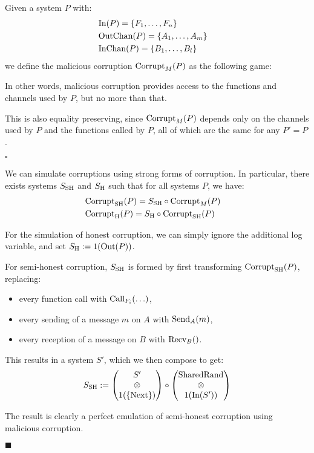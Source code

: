 \begin{definition}
Given a system $P$ with:
$$
\begin{aligned}
  &\text{In}(P) = \{F_1, \ldots, F_n\}\cr
  &\text{OutChan}(P) = \{A_1, \ldots, A_m\}\cr
  &\text{InChan}(P) = \{B_1, \ldots, B_l\}\cr
\end{aligned}
$$
we define the malicious corruption $\text{Corrupt}_M(P)$ as the following game:

In other words, malicious corruption provides access to the functions
and channels used by $P$, but no more than that.

This is also equality preserving, since $\text{Corrupt}_M(P)$ depends
only on the channels used by $P$ and the functions called by $P$,
all of which are the same for any $P' = P$.

$\square$
\end{definition}

\begin{lemma}
  \label{thm:simulatingcorruption}
  We can simulate corruptions using strong forms of corruption.
  In particular, there exists systems $S_{\text{SH}}$ and $S_{\text{H}}$ such that
  for all systems $P$, we have:
  \[
    \begin{aligned}
      &\text{Corrupt}_{\text{SH}}(P) = S_{\text{SH}} \circ \text{Corrupt}_M(P)\cr
      &\text{Corrupt}_{\text{H}}(P) = S_{\text{H}} \circ \text{Corrupt}_{\text{SH}}(P)
    \end{aligned}
  \]

For the simulation of honest corruption, we can simply ignore
  the additional log variable, and set $S_{\text{H}} := 1(\text{Out}(P))$.

For semi-honest corruption, $S_{\text{SH}}$ is formed by first transforming
$\text{Corrupt}_{\text{SH}}(P)$, replacing:
\begin{itemize}
  \item every function call with $\text{Call}_{F_i}(\ldots)$,
  \item every sending of a message $m$ on $A$ with $\text{Send}_A(m)$,
  \item every reception of a message on $B$ with $\text{Recv}_B()$.
\end{itemize}
This results in a system $S'$, which we then compose to get:
$$
S_{\text{SH}} :=
\begin{pmatrix}
  S'\cr
  \otimes\cr
  1(\{\text{Next}\})
\end{pmatrix}
\circ
\begin{pmatrix}
\text{SharedRand}\cr
\otimes\cr
1(\text{In}(S'))
\end{pmatrix}
$$

The result is clearly a perfect emulation of semi-honest corruption
using malicious corruption.

$\blacksquare$
\end{lemma}

